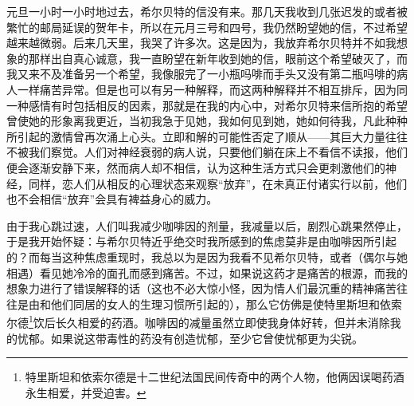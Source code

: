 \par 元旦一小时一小时地过去，希尔贝特的信没有来。那几天我收到几张迟发的或者被繁忙的邮局延误的贺年卡，所以在元月三号和四号，我仍然盼望她的信，不过希望越来越微弱。后来几天里，我哭了许多次。这是因为，我放弃希尔贝特并不如我想象的那样出自真心诚意，我一直盼望在新年收到她的信，眼前这个希望破灭了，而我又来不及准备另一个希望，我像服完了一小瓶吗啡而手头又没有第二瓶吗啡的病人一样痛苦异常。但是也可以有另一种解释，而这两种解释并不相互排斥，因为同一种感情有时包括相反的因素，那就是在我的内心中，对希尔贝特来信所抱的希望曾使她的形象离我更近，当初我急于见她，我如何见到她，她如何待我，凡此种种所引起的激情曾再次涌上心头。立即和解的可能性否定了顺从——其巨大力量往往不被我们察觉。人们对神经衰弱的病人说，只要他们躺在床上不看信不读报，他们便会逐渐安静下来，然而病人却不相信，认为这种生活方式只会更刺激他们的神经，同样，恋人们从相反的心理状态来观察“放弃”，在未真正付诸实行以前，他们也不会相信“放弃”会具有裨益身心的威力。
\par 由于我心跳过速，人们叫我减少咖啡因的剂量，我减量以后，剧烈心跳果然停止，于是我开始怀疑：与希尔贝特近乎绝交时我所感到的焦虑莫非是由咖啡因所引起的？而每当这种焦虑重现时，我总以为是因为我看不见希尔贝特，或者（偶尔与她相遇）看见她冷冷的面孔而感到痛苦。不过，如果说这药才是痛苦的根源，而我的想象力进行了错误解释的话（这也不必大惊小怪，因为情人们最沉重的精神痛苦往往是由和他们同居的女人的生理习惯所引起的），那么它仿佛是使特里斯坦和依索尔德\footnote{特里斯坦和依索尔德是十二世纪法国民间传奇中的两个人物，他俩因误喝药酒永生相爱，并受迫害。}饮后长久相爱的药酒。咖啡因的减量虽然立即使我身体好转，但并未消除我的忧郁。如果说这带毒性的药没有创造忧郁，至少它曾使忧郁更为尖锐。
